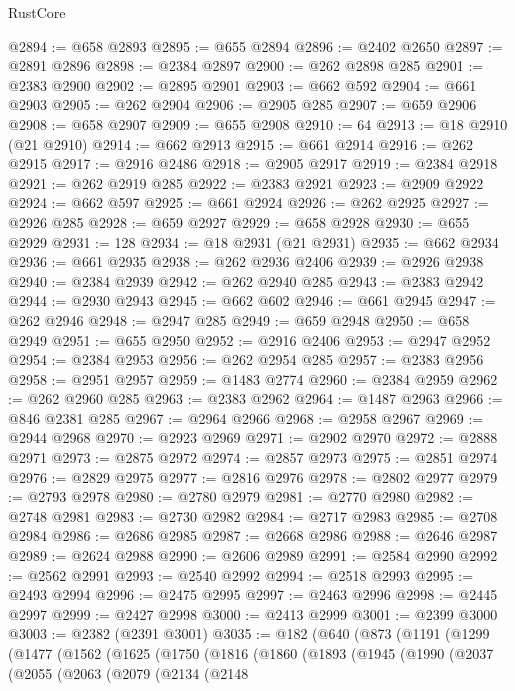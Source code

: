 \begin{lexlean}{RustCore}
\begin{coremodule}
@2894 := @658 @2893
@2895 := @655 @2894
@2896 := @2402 @2650
@2897 := @2891 @2896
@2898 := @2384 @2897
@2900 := @262 @2898 @285
@2901 := @2383 @2900
@2902 := @2895 @2901
@2903 := @662 @592
@2904 := @661 @2903
@2905 := @262 @2904
@2906 := @2905 @285
@2907 := @659 @2906
@2908 := @658 @2907
@2909 := @655 @2908
@2910 := 64
@2913 := @18 @2910 (@21 @2910)
@2914 := @662 @2913
@2915 := @661 @2914
@2916 := @262 @2915
@2917 := @2916 @2486
@2918 := @2905 @2917
@2919 := @2384 @2918
@2921 := @262 @2919 @285
@2922 := @2383 @2921
@2923 := @2909 @2922
@2924 := @662 @597
@2925 := @661 @2924
@2926 := @262 @2925
@2927 := @2926 @285
@2928 := @659 @2927
@2929 := @658 @2928
@2930 := @655 @2929
@2931 := 128
@2934 := @18 @2931 (@21 @2931)
@2935 := @662 @2934
@2936 := @661 @2935
@2938 := @262 @2936 @2406
@2939 := @2926 @2938
@2940 := @2384 @2939
@2942 := @262 @2940 @285
@2943 := @2383 @2942
@2944 := @2930 @2943
@2945 := @662 @602
@2946 := @661 @2945
@2947 := @262 @2946
@2948 := @2947 @285
@2949 := @659 @2948
@2950 := @658 @2949
@2951 := @655 @2950
@2952 := @2916 @2406
@2953 := @2947 @2952
@2954 := @2384 @2953
@2956 := @262 @2954 @285
@2957 := @2383 @2956
@2958 := @2951 @2957
@2959 := @1483 @2774
@2960 := @2384 @2959
@2962 := @262 @2960 @285
@2963 := @2383 @2962
@2964 := @1487 @2963
@2966 := @846 @2381 @285
@2967 := @2964 @2966
@2968 := @2958 @2967
@2969 := @2944 @2968
@2970 := @2923 @2969
@2971 := @2902 @2970
@2972 := @2888 @2971
@2973 := @2875 @2972
@2974 := @2857 @2973
@2975 := @2851 @2974
@2976 := @2829 @2975
@2977 := @2816 @2976
@2978 := @2802 @2977
@2979 := @2793 @2978
@2980 := @2780 @2979
@2981 := @2770 @2980
@2982 := @2748 @2981
@2983 := @2730 @2982
@2984 := @2717 @2983
@2985 := @2708 @2984
@2986 := @2686 @2985
@2987 := @2668 @2986
@2988 := @2646 @2987
@2989 := @2624 @2988
@2990 := @2606 @2989
@2991 := @2584 @2990
@2992 := @2562 @2991
@2993 := @2540 @2992
@2994 := @2518 @2993
@2995 := @2493 @2994
@2996 := @2475 @2995
@2997 := @2463 @2996
@2998 := @2445 @2997
@2999 := @2427 @2998
@3000 := @2413 @2999
@3001 := @2399 @3000
@3003 := @2382 (@2391 @3001)
@3035 := @182
    (@640
      (@873
        (@1191
          (@1299
            (@1477
              (@1562
                (@1625
                  (@1750
                    (@1816
                      (@1860
                        (@1893
                          (@1945
                            (@1990
                              (@2037
                                (@2055
                                  (@2063
                                    (@2079
                                      (@2134
                                        (@2148

\end{coremodule}
\end{lexlean}
